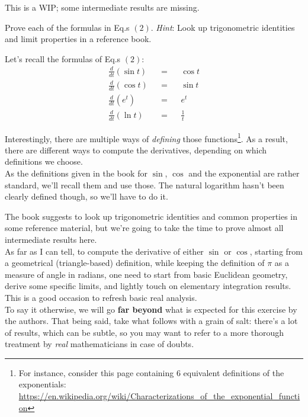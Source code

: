 \documentclass[solutions.tex]{subfiles}
\begin{document}
\maketitle
\begin{remark} This is a WIP; some intermediate results are missing.
\end{remark}
\begin{exercise} Prove each of the formulas in Eq.s $(2)$.
\textit{Hint}: Look up trigonometric identities and limit
properties in a reference book.
\end{exercise}

Let's recall the formulas of Eq.s $(2)$:
\begin{equation*} \begin{aligned}
	\frac{d}{dt}(\sin t) &&=&& \cos t \\
	\frac{d}{dt}(\cos t) &&=&& \sin t \\
	\frac{d}{dt}(e^t) &&=&& e^t \\
	\frac{d}{dt}(\ln t) &&=&& \frac{1}{t}
\end{aligned} \end{equation*}

\begin{remark}
Interestingly, there are multiple ways of \textit{defining}
those functions\footnote{For instance, consider this page
containing $6$ equivalent definitions of the exponentials:
\url{https://en.wikipedia.org/wiki/Characterizations\_of\_the\_exponential\_function}}.
As a result, there are different ways to compute the derivatives,
depending on which definitions we choose. \\

As the definitions given in the book for $\sin$, $\cos$ and
the exponential are rather standard, we'll recall them and use
those. The natural logarithm hasn't been clearly defined though,
so we'll have to do it.
\end{remark}

\begin{remark} The book suggests to look up trigonometric
identities and common properties in some reference material, but
we're going to take the time to prove almost all intermediate results
here. \\

As far as I can tell, to compute the derivative of either $\sin$
or $\cos$, starting from a geometrical (triangle-based) definition,
while keeping the definition of $\pi$ as a measure of angle in radians,
one need to start from basic Euclidean geometry, derive
some specific limits, and lightly touch on elementary integration
results. This is a good occasion to refresh basic real analysis. \\

To say it otherwise, we will go \textbf{far beyond} what is expected
for this exercise by the authors. That being said, take what follows with a
grain of salt: there's a lot of results, which can be subtle, so you may
want to refer to a more thorough treatment by \textit{real} mathematicians
in case of doubts.
\end{remark}
\end{document}
